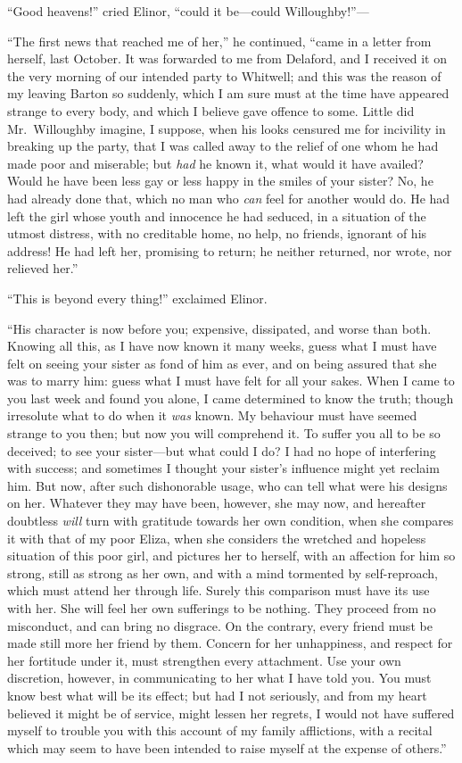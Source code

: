\documentclass{article}
\begin{document}
``Good heavens!'' cried Elinor, ``could it be---could
Willoughby!''---%

``The first news that reached me of her,'' he continued,
``came in a letter from herself, last October.
It was forwarded to me from Delaford, and I received it
on the very morning of our intended party to Whitwell;
and this was the reason of my leaving Barton so suddenly,
which I am sure must at the time have appeared strange
to every body, and which I believe gave offence to some.
Little did Mr.\ Willoughby imagine, I suppose, when his
looks censured me for incivility in breaking up the party,
that I was called away to the relief of one whom he
had made poor and miserable; but \emph{had} he known it,
what would it have availed?  Would he have been less
gay or less happy in the smiles of your sister?  No,
he had already done that, which no man who \emph{can} feel
for another would do.  He had left the girl whose
youth and innocence he had seduced, in a situation of
the utmost distress, with no creditable home, no help,
no friends, ignorant of his address!  He had left her,
promising to return; he neither returned, nor wrote,
nor relieved her.''

``This is beyond every thing!'' exclaimed Elinor.

``His character is now before you; expensive, dissipated,
and worse than both.  Knowing all this, as I have now
known it many weeks, guess what I must have felt on seeing
your sister as fond of him as ever, and on being assured
that she was to marry him: guess what I must have felt
for all your sakes.  When I came to you last week and
found you alone, I came determined to know the truth;
though irresolute what to do when it \emph{was} known.
My behaviour must have seemed strange to you then;
but now you will comprehend it.  To suffer you all to be
so deceived; to see your sister---but what could I do?
I had no hope of interfering with success; and sometimes
I thought your sister's influence might yet reclaim him.
But now, after such dishonorable usage, who can tell what
were his designs on her.  Whatever they may have been,
however, she may now, and hereafter doubtless \emph{will}
turn with gratitude towards her own condition, when she
compares it with that of my poor Eliza, when she considers
the wretched and hopeless situation of this poor girl,
and pictures her to herself, with an affection for him so strong,
still as strong as her own, and with a mind tormented
by self-reproach, which must attend her through life.
Surely this comparison must have its use with her.
She will feel her own sufferings to be nothing.  They
proceed from no misconduct, and can bring no disgrace.
On the contrary, every friend must be made still more
her friend by them.  Concern for her unhappiness,
and respect for her fortitude under it, must strengthen
every attachment.  Use your own discretion, however,
in communicating to her what I have told you.  You must
know best what will be its effect; but had I not seriously,
and from my heart believed it might be of service,
might lessen her regrets, I would not have suffered
myself to trouble you with this account of my family
afflictions, with a recital which may seem to have been
intended to raise myself at the expense of others.''
\end{document}
